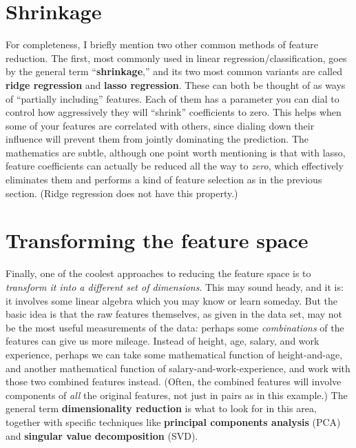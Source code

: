 \section{Shrinkage}

For completeness, I briefly mention two other common methods of feature
reduction. The first, most commonly used in linear regression/classification,
goes by the general term ``\textbf{shrinkage},'' and its two most common
variants are called \textbf{ridge regression} and \textbf{lasso regression}.
These can both be thought of as ways of ``partially including'' features. Each
of them has a parameter you can dial to control how aggressively they will
``shrink'' coefficients to zero. This helps when some of your features are
correlated with others, since dialing down their influence will prevent them
from jointly dominating the prediction. The mathematics are subtle, although
one point worth mentioning is that with lasso, feature coefficients can
actually be reduced all the way to \textit{zero}, which effectively eliminates
them and performs a kind of feature selection as in the previous section.
(Ridge regression does not have this property.)

\section{Transforming the feature space}

Finally, one of the coolest approaches to reducing the feature space is to
\textit{transform it into a different set of dimensions}. This may sound
heady, and it is: it involves some linear algebra which you may know or learn
someday. But the basic idea is that the raw features themselves, as given in
the data set, may not be the most useful measurements of the data: perhaps
some \textit{combinations} of the features can give us more mileage. Instead
of height, age, salary, and work experience, perhaps we can take some
mathematical function of height-and-age, and another mathematical function of
salary-and-work-experience, and work with those two combined features instead.
(Often, the combined features will involve components of \textit{all} the
original features, not just in pairs as in this example.) The general term
\textbf{dimensionality reduction} is what to look for in this area, together
with specific techniques like \textbf{principal components analysis} (PCA) and
\textbf{singular value decomposition} (SVD).



